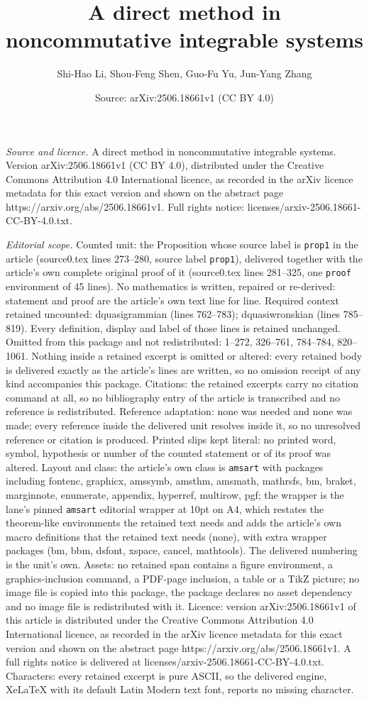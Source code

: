 \documentclass[10pt,a4paper]{amsart}
\title[A direct method in noncommutative integrable systems]{A direct method in noncommutative integrable systems}
\author{Shi-Hao Li, Shou-Feng Shen, Guo-Fu Yu, Jun-Yang Zhang}
\date{Source: arXiv:2506.18661v1 (CC BY 4.0)}
\begin{document}
\maketitle

\noindent\emph{Source and licence.} A direct method in noncommutative integrable systems. Version arXiv:2506.18661v1 (CC BY 4.0), distributed under the Creative Commons Attribution 4.0 International licence, as recorded in the arXiv licence metadata for this exact version and shown on the abstract page https://arxiv.org/abs/2506.18661v1. Full rights notice: licenses/arxiv-2506.18661-CC-BY-4.0.txt.\par\smallskip

\noindent\textit{Editorial scope.} Counted unit: the Proposition whose source label is \texttt{prop1} in the article (source0.tex lines 273--280, source label \texttt{prop1}), delivered together with the article's own complete original proof of it (source0.tex lines 281--325, one \texttt{proof} environment of 45 lines). No mathematics is written, repaired or re-derived: statement and proof are the article's own text line for line. Required context retained uncounted: dquasigrammian (lines 762--783); dquasiwronskian (lines 785--819). Every definition, display and label of those lines is retained unchanged. Omitted from this package and not redistributed: 1--272, 326--761, 784--784, 820--1061. Nothing inside a retained excerpt is omitted or altered: every retained body is delivered exactly as the article's lines are written, so no omission receipt of any kind accompanies this package. Citations: the retained excerpts carry no citation command at all, so no bibliography entry of the article is transcribed and no reference is redistributed. Reference adaptation: none was needed and none was made; every reference inside the delivered unit resolves inside it, so no unresolved reference or citation is produced. Printed slips kept literal: no printed word, symbol, hypothesis or number of the counted statement or of its proof was altered. Layout and class: the article's own class is \texttt{amsart} with packages including fontenc, graphicx, amssymb, amsthm, amsmath, mathrsfs, bm, braket, marginnote, enumerate, appendix, hyperref, multirow, pgf; the wrapper is the lane's pinned \texttt{amsart} editorial wrapper at 10pt on A4, which restates the theorem-like environments the retained text needs and adds the article's own macro definitions that the retained text needs (none), with extra wrapper packages (bm, bbm, dsfont, xspace, cancel, mathtools). The delivered numbering is the unit's own. Assets: no retained span contains a figure environment, a graphics-inclusion command, a PDF-page inclusion, a table or a TikZ picture; no image file is copied into this package, the package declares no asset dependency and no image file is redistributed with it. Licence: version arXiv:2506.18661v1 of this article is distributed under the Creative Commons Attribution 4.0 International licence, as recorded in the arXiv licence metadata for this exact version and shown on the abstract page https://arxiv.org/abs/2506.18661v1. A full rights notice is delivered at licenses/arxiv-2506.18661-CC-BY-4.0.txt. Characters: every retained excerpt is pure ASCII, so the delivered engine, XeLaTeX with its default Latin Modern text font, reports no missing character.
\end{document}
